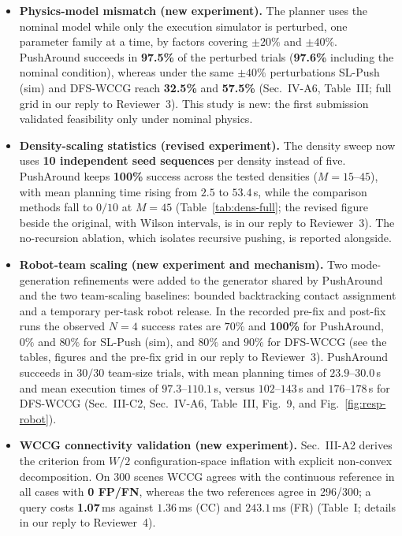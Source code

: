 \documentclass[11pt]{article}
\begin{document}
\begin{itemize}
\item \textbf{Physics-model mismatch (new experiment).} The planner uses the nominal model while only the execution simulator is
perturbed, one parameter family at a time, by factors covering $\pm20\%$ and
$\pm40\%$. PushAround succeeds in \textbf{97.5\%} of the perturbed trials (\textbf{97.6\%}
including the nominal condition), whereas under the same $\pm40\%$ perturbations SL-Push (sim)
and DFS-WCCG reach \textbf{32.5\%} and \textbf{57.5\%} (Sec.~IV-A6, Table~III;
full grid in our reply to Reviewer~3). This study is new: the first submission validated
feasibility only under nominal physics.

\item \textbf{Density-scaling statistics (revised experiment).} The density sweep now uses \textbf{10 independent seed sequences} per
density instead of five. PushAround keeps \textbf{100\%} success across the tested
densities ($M{=}15$--$45$), with mean planning time rising from $2.5$ to $53.4$\,s, while the
comparison methods fall to $0/10$ at $M{=}45$ (Table~\ref{tab:dens-full}; the revised figure beside the original, with Wilson intervals, is in
our reply to Reviewer~3). The no-recursion ablation, which isolates recursive pushing, is reported alongside.

\item \textbf{Robot-team scaling (new experiment and mechanism).} Two mode-generation refinements were added to the generator shared by
PushAround and the two team-scaling baselines: bounded backtracking contact assignment and a
temporary per-task robot release. In the recorded pre-fix and post-fix runs the observed $N{=}4$ success rates are $70\%$ and
\textbf{100\%} for PushAround, $0\%$ and $80\%$ for SL-Push (sim), and $80\%$ and $90\%$ for
DFS-WCCG (see the tables, figures and the pre-fix grid in our reply to Reviewer~3).
PushAround
succeeds in $30/30$ team-size trials, with mean planning times of $23.9$--$30.0$\,s and mean execution times
of $97.3$--$110.1$\,s, versus $102$--$143$\,s and $176$--$178$\,s for DFS-WCCG (Sec.~III-C2, Sec.~IV-A6,
Table~III, Fig.~9, and Fig.~\ref{fig:resp-robot}).

\item \textbf{WCCG connectivity validation (new experiment).} Sec.~III-A2 derives the criterion from $W/2$ configuration-space inflation
with explicit non-convex decomposition. On 300 scenes WCCG agrees with the continuous
reference in all cases with \textbf{0 FP/FN}, whereas the two references agree in 296/300; a query
costs \textbf{1.07}\,ms against $1.36$\,ms (CC) and $243.1$\,ms (FR) (Table~I; details in our reply
to Reviewer~4).


\end{itemize}
\end{document}
